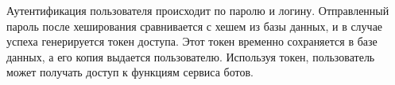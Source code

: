 Аутентификация пользователя происходит по паролю и логину.
Отправленный пароль после хеширования
сравнивается с хешем из базы данных, и в случае успеха генерируется токен доступа.
Этот токен временно сохраняется в базе данных, а его копия выдается пользователю.
Используя токен, пользователь может получать доступ к функциям сервиса ботов.

